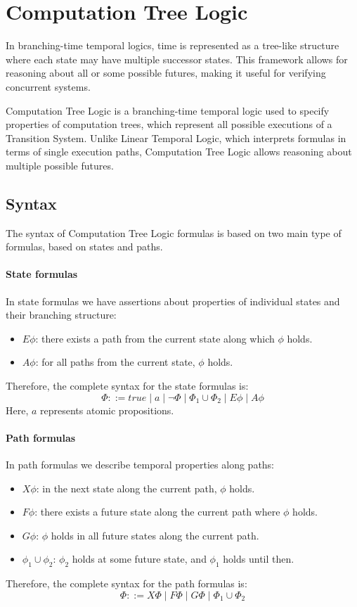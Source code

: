 \section{Computation Tree Logic}

In branching-time temporal logics, time is represented as a tree-like structure where each state may have multiple successor states. 
This framework allows for reasoning about all or some possible futures, making it useful for verifying concurrent systems.

Computation Tree Logic is a branching-time temporal logic used to specify properties of computation trees, which represent all possible executions of a Transition System. 
Unlike Linear Temporal Logic, which interprets formulas in terms of single execution paths, Computation Tree Logic allows reasoning about multiple possible futures.

\subsection{Syntax}
The syntax of Computation Tree Logic formulas is based on two main type of formulas, based on states and paths. 

\paragraph*{State formulas}
In state formulas we have assertions about properties of individual states and their branching structure: 
\begin{itemize}
    \item $E\phi$: there exists a path from the current state along which $\phi$ holds.
    \item $A\phi$: for all paths from the current state, $\phi$ holds.
\end{itemize}
\noindent Therefore, the complete syntax for the state formulas is:
\[\Phi ::= true \mid a \mid \lnot \Phi \mid \Phi_1\cup \Phi_2 \mid E\phi \mid A\phi\]
\noindent Here, $a$ represents atomic propositions.

\paragraph*{Path formulas}
In path formulas we describe temporal properties along paths: 
\begin{itemize}
    \item $X\phi$: in the next state along the current path, $\phi$ holds.
    \item $F\phi$: there exists a future state along the current path where $\phi$ holds.
    \item $G\phi$: $\phi$ holds in all future states along the current path.
    \item $\phi_1 \cup \phi_2$: $\phi_2$ holds at some future state, and $\phi_1$ holds until then.
\end{itemize}
\noindent Therefore, the complete syntax for the path formulas is:
\[\Phi ::= X \Phi \mid F\Phi\mid G\Phi \mid\Phi_1\cup\Phi_2\]

